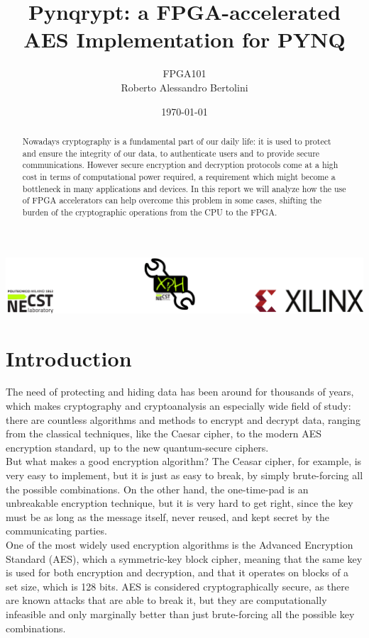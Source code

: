 \documentclass[12pt,oneside,a4paper]{article}
\title{\textbf{Pynqrypt: a FPGA-accelerated AES Implementation for PYNQ}}
\author{FPGA101\\Roberto Alessandro Bertolini}
\date{\today}
\begin{document}
\begin{titlepage}
	\centering
	\clearpage
	\maketitle
	\thispagestyle{empty}
	\vspace*{1cm}
	\vfill
	\centering
	\includegraphics{footer.png}
\end{titlepage}


\begin{abstract}
Nowadays cryptography is a fundamental part of our daily life: it is used to protect and ensure the integrity of our data, to authenticate users and to provide secure communications.
However secure encryption and decryption protocols come at a high cost in terms of computational power required, a requirement which might become a bottleneck in many applications and devices.
In this report we will analyze how the use of FPGA accelerators can help overcome this problem in some cases, shifting the burden of the cryptographic operations from the CPU to the FPGA.
\end{abstract}

\section{Introduction} \label{sec:intro}
The need of protecting and hiding data has been around for thousands of years, which makes cryptography and cryptoanalysis an especially wide field of study: there are countless algorithms and methods to encrypt and decrypt data, ranging from the classical techniques, like the Caesar cipher, to the modern AES encryption standard, up to the new quantum-secure ciphers.
\\
But what makes a good encryption algorithm? The Ceasar cipher, for example, is very easy to implement, but it is just as easy to break, by simply brute-forcing all the possible combinations.
On the other hand, the one-time-pad is an unbreakable encryption technique, but it is very hard to get right, since the key must be as long as the message itself, never reused, and kept secret by the communicating parties.
\\
One of the most widely used encryption algorithms is the Advanced Encryption Standard (AES), which a symmetric-key block cipher, meaning that the same key is used for both encryption and decryption, and that it operates on blocks of a set size, which is 128 bits.
AES is considered cryptographically secure, as there are known attacks that are able to break it, but they are computationally infeasible and only marginally better than just brute-forcing all the possible key combinations.
\end{document}
